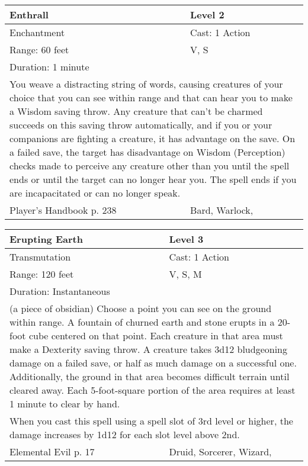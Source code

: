 \documentclass[11pt]{report}
\begin{document}
\begin{table}[H]
	\begin{tabular}{||p{6cm}|p{6cm}||}
		\hline\hline
		\bf{Enthrall} & Level 2\\ \hline
		Enchantment & Cast: 1 Action\\ \hline
		Range: 60 feet & V, S\\ \hline
		Duration: 1 minute & \\ \hline
		\multicolumn{2}{||p{12cm}||}{You weave a distracting string of words, causing creatures of your choice that you can see within range and that can hear you to make a Wisdom saving throw. Any creature that can’t be charmed succeeds on this saving throw automatically, and if you or your companions are fighting a creature, it has advantage on the save. On a failed save, the target has disadvantage on Wisdom (Perception) checks made to perceive any creature other than you until the spell ends or until the target can no longer hear you. The spell ends if you are incapacitated or can no longer speak.}\\ \hline
Player's Handbook p. 238 & Bard, Warlock, \\ \hline\hline
	\end{tabular}
\end{table}

\begin{table}[H]
	\begin{tabular}{||p{6cm}|p{6cm}||}
		\hline\hline
		\bf{Erupting Earth} & Level 3\\ \hline
		Transmutation & Cast: 1 Action\\ \hline
		Range: 120 feet & V, S, M\\ \hline
		Duration: Instantaneous & \\ \hline
		\multicolumn{2}{||p{12cm}||}{(a piece of obsidian)
Choose a point you can see on the ground within range. A fountain of churned earth and stone erupts in a 20-foot cube centered on that point. Each creature
in that area must make a Dexterity saving throw. A creature takes 3d12 bludgeoning damage on a failed save, or half as much damage on a successful one. Additionally, the ground in that area becomes difficult terrain until cleared away. Each 5-foot-square portion of the area requires at least 1 minute to clear by hand.}\\ \hline
		\multicolumn{2}{||p{12cm}||}{When you cast this spell using a spell slot of 3rd level or higher, the damage increases by 1d12 for each slot level above 2nd.}\\ \hline
Elemental Evil p. 17 & Druid, Sorcerer, Wizard, \\ \hline\hline
	\end{tabular}
\end{table}
\end{document}
